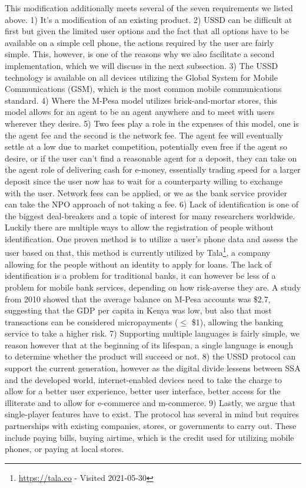 \documentclass[11pt, a4paper]{article}
\begin{document}
This modification additionally meets several of the seven requirements we listed above.
1) It's a modification of an existing product.
2) USSD can be difficult at first but given the limited user options and the fact that all options have to be available on a simple cell phone, the actions required by the user are fairly simple. This, however, is one of the reasons why we also facilitate a second implementation, which we will discuss in the next subsection.
3) The USSD technology is available on all devices utilizing the Global System for Mobile Communications (GSM), which is the most common mobile communications standard.
4) Where the M-Pesa model utilizes brick-and-mortar stores, this model allows for an agent to be an agent anywhere and to meet with users wherever they desire.
5) Two fees play a role in the expenses of this model, one is the agent fee and the second is the network fee. The agent fee will eventually settle at a low due to market competition, potentially even free if the agent so desire, or if the user can't find a reasonable agent for a deposit, they can take on the agent role of delivering cash for e-money, essentially trading speed for a larger deposit since the user now has to wait for a counterparty willing to exchange with the user. Network fees can be applied, or we as the bank service provider can take the NPO approach of not taking a fee.
6) Lack of identification is one of the biggest deal-breakers and a topic of interest for many researchers worldwide. Luckily there are multiple ways to allow the registration of people without identification. One proven method is to utilize a user's phone data and assess the user based on that, this method is currently utilized by Tala\footnote{\url{https://tala.co} - Visited 2021-05-30}, a company allowing for the people without an identity to apply for loans. The lack of identification is a problem for traditional banks, it can however be less of a problem for mobile bank services, depending on how risk-averse they are. A study from 2010 showed that the average balance on M-Pesa accounts was \$2.7\cite{mpesastats}, suggesting that the GDP per capita in Kenya was low, but also that most transactions can be considered micropayments ($\le$ \$1), allowing the banking service to take a higher risk.
7) Supporting multiple languages is fairly simple, we reason however that at the beginning of its lifespan, a single language is enough to determine whether the product will succeed or not.
8) the USSD protocol can support the current generation, however as the digital divide lessens between SSA and the developed world, internet-enabled devices need to take the charge to allow for a better user experience, better user interface, better access for the illiterate and to allow for e-commerce and m-commerce.
9) Lastly, we argue that single-player features have to exist. The protocol has several in mind but requires partnerships with existing companies, stores, or governments to carry out. These include paying bills, buying airtime, which is the credit used for utilizing mobile phones, or paying at local stores.
\end{document}
